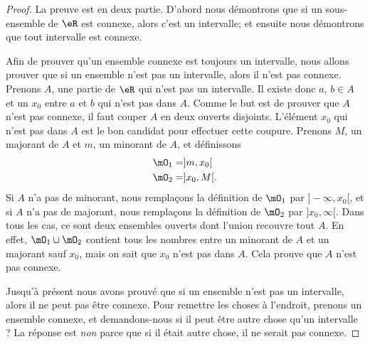\begin{proof}
    La preuve est en deux partie. D'abord nous démontrons que si un sous-ensemble de $\eR$ est connexe, alors c'est un intervalle; et ensuite nous démontrons que tout intervalle est connexe.

    Afin de prouver qu'un ensemble connexe est toujours un intervalle, nous allons prouver que si un ensemble n'est pas un intervalle, alors il n'est pas connexe. Prenons $A$, une partie de $\eR$ qui n'est pas un intervalle. Il existe donc $a$, $b\in A$ et un $x_0$ entre $a$ et $b$ qui n'est pas dans $A$. Comme le but est de prouver que $A$ n'est pas connexe, il faut couper $A$ en deux ouverts disjoints. L'élément $x_0$ qui n'est pas dans $A$ est le bon candidat pour effectuer cette coupure. Prenons $M$, un majorant de $A$ et $m$, un minorant de $A$, et définissons 
    \begin{align*}
        \mO_1&=]m,x_0[\\
        \mO_2&=]x_0,M[.
    \end{align*}
    Si $A$ n'a pas de minorant, nous remplaçons la définition de $\mO_1$ par $]-\infty,x_0[$, et si $A$ n'a pas de majorant, nous remplaçons la définition de $\mO_2$ par $]x_0,\infty[$. Dans tous les cas, ce sont deux ensembles ouverts dont l'union recouvre tout $A$. En effet, $\mO_1\cup \mO_2$ contient tous les nombres entre un minorant de $A$ et un majorant sauf $x_0$, mais on sait que $x_0$ n'est pas dans $A$. Cela prouve que $A$ n'est pas connexe.

    Jusqu'à présent nous avons prouvé que si un ensemble n'est pas un intervalle, alors il ne peut pas être connexe. Pour remettre les choses à l'endroit, prenons un ensemble connexe, et demandons-nous si il peut être autre chose qu'un intervalle ? La réponse est \emph{non} parce que si il était autre chose, il ne serait pas connexe.


\end{proof}

